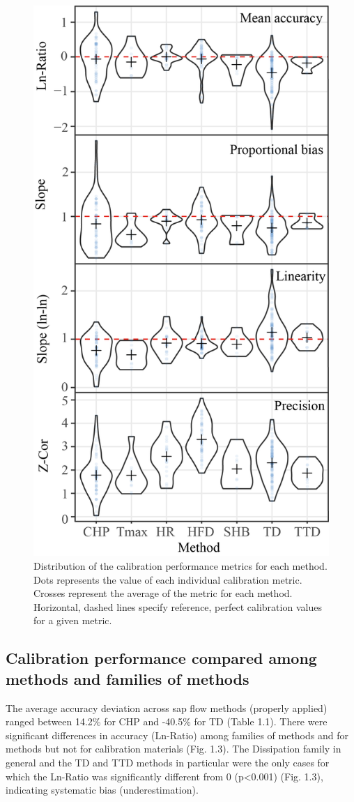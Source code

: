 \documentclass[11pt,twoside]{reedthesis}
\begin{document}
\begin{figure}[hbt!]

{\centering \includegraphics[width=0.55\linewidth]{figure/CH2/Distribution-metrics-orderedV4} 

}

\caption[Distribution of the calibration performance metrics for each method.]{Distribution of the calibration performance metrics for each method. Dots represents the value of each individual calibration metric. Crosses represent the average of the metric for each method. Horizontal, dashed lines specify reference, perfect calibration values for a given metric.}\label{fig:ch2fig2}
\end{figure}
\subsection{Calibration performance compared among methods and families
of
methods}\label{calibration-performance-compared-among-methods-and-families-of-methods}

The average accuracy deviation across sap flow methods (properly
applied) ranged between 14.2\% for CHP and -40.5\% for TD (Table 1.1).
There were significant differences in accuracy (Ln-Ratio) among families
of methods and for methods but not for calibration materials (Fig. 1.3).
The Dissipation family in general and the TD and TTD methods in
particular were the only cases for which the Ln-Ratio was significantly
different from 0 (p\textless{}0.001) (Fig. 1.3), indicating systematic
bias (underestimation).\par
\end{document}
